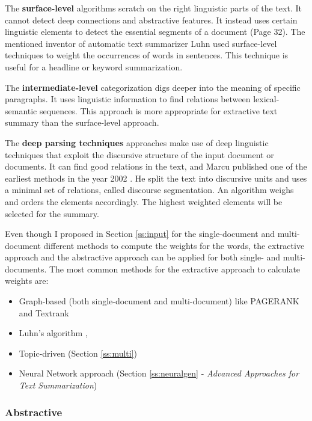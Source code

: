 The \textbf{surface-level} algorithms scratch on the right linguistic parts of the text. It cannot detect deep connections and abstractive features. It instead uses certain linguistic elements to detect the essential segments of a document \cite{juan} (Page 32). The mentioned inventor of automatic text summarizer Luhn \cite{textmining1958} used surface-level techniques to weight the occurrences of words in sentences. This technique is useful for a headline or keyword summarization. 

The \textbf{intermediate-level} categorization digs deeper into the meaning of specific paragraphs. It uses linguistic information to find relations between lexical-semantic sequences. This approach is more appropriate for extractive text summary than the surface-level approach.

The \textbf{deep parsing techniques} approaches make use of deep linguistic techniques that exploit the discursive structure of the input document or documents. It can find good relations in the text, and Marcu published one of the earliest methods in the year 2002 \cite{marcu}. He split the text into discursive units and uses a minimal set of relations, called discourse segmentation. An algorithm weighs and orders the elements accordingly. The highest weighted elements will be selected for the summary.

Even though I proposed in Section \ref{ss:input} for the single-document and multi-document different methods to compute the weights for the words, the extractive approach and the abstractive approach can be applied for both single- and multi-documents. The most common methods for the extractive approach to calculate weights are:

\begin{itemize}
	\item Graph-based (both single-document and multi-document) like PAGERANK and Textrank
	\item Luhn's algorithm \cite{textmining1958}, 
	\item Topic-driven (Section \ref{ss:multi}) 
	\item Neural Network approach (Section \ref{ss:neuralgen} - \textit{Advanced Approaches for Text Summarization})
\end{itemize}

\subsubsection{Abstractive}\label{ss:abstractive}

